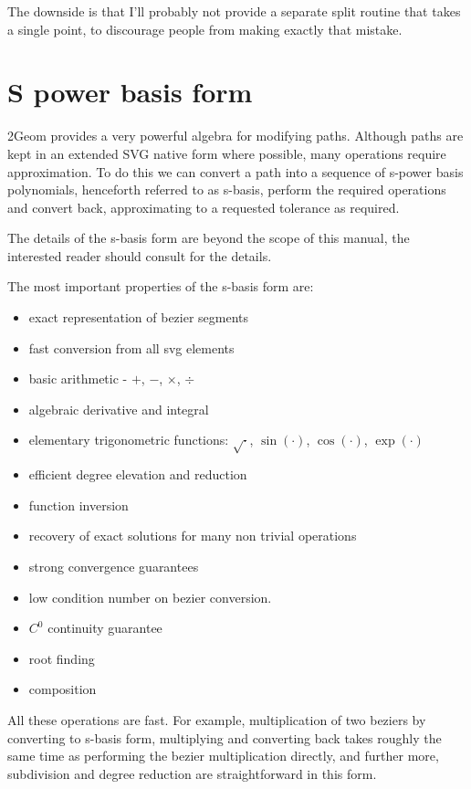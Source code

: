 The downside is that I'll probably not provide a separate split
routine that takes a single point, to discourage people from making
exactly that mistake.

\section{S power basis form}

2Geom provides a very powerful algebra for modifying paths.  Although
paths are kept in an extended SVG native form where possible, many
operations require approximation.  To do this we can convert a path
into a sequence of s-power basis polynomials, henceforth referred to
as s-basis, perform the required operations and convert back,
approximating to a requested tolerance as required.

The details of the s-basis form are beyond the scope of this manual,
the interested reader should consult \cite{SanchezReyes1997,SanchezReyes2000,SanchezReyes2001,SanchezReyes2003,SanchezReyes2004} for the details.

The most important properties of the s-basis form are:
\begin{itemize}
\item exact representation of bezier segments
\item fast conversion from all svg elements
\item basic arithmetic - $+$, $-$, $\times$, $\div$
\item algebraic derivative and integral
\item elementary trigonometric functions: $\sqrt{\cdot}$, $\sin(\cdot)$, $\cos(\cdot)$, $\exp(\cdot)$
\item efficient degree elevation and reduction
\item function inversion
\item recovery of exact solutions for many non trivial operations
\item strong convergence guarantees
\item low condition number on bezier conversion.
\item $C^0$ continuity guarantee
\item root finding
\item composition
\end{itemize}

All these operations are fast.  For example, multiplication of two
beziers by converting to s-basis form, multiplying and converting back
takes roughly the same time as performing the bezier multiplication
directly, and further more, subdivision and degree reduction are
straightforward in this form.

